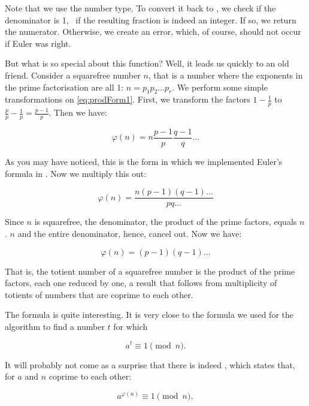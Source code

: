 \documentclass[tikz]{scrreprt}
\newcommand{\texfamily}{\fontfamily{cmtex}\selectfont}
\begin{document}
Note that we use the \text{\texfamily {\itshape Ratio}} number type.
To convert it back to \text{\texfamily {\itshape Natural}},
we check if the denominator is 1,
\ie\ if the resulting fraction is indeed
an integer. If so, we return the numerator.
Otherwise, we create an error, which, of course, 
should not occur if Euler was right.

But what is so special about this function?
Well, it leads us quickly to an old friend.
Consider a squarefree number $n$, that is a number
where the exponents in the prime factorisation
are all 1: $n = p_1p_2\dots p_r$.
We perform some simple transformations on 
\ref{eq:prodForm1}.
First, we transform the factors $1-\frac{1}{p}$
to $\frac{p}{p} - \frac{1}{p} = \frac{p-1}{p}$.
Then we have:

\begin{equation}
\varphi(n) = n\frac{p-1}{p}\frac{q-1}{q}\dots
\end{equation}

As you may have noticed,
this is the form in which we implemented Euler's formula in \text{\texfamily ptot}.
Now we multiply this out:

\begin{equation}
\varphi(n) = \frac{n(p-1)(q-1)\dots}{pq\dots}
\end{equation}

Since $n$ is squarefree, the denominator,
the product of the prime factors, equals $n$.
$n$ and the entire denominator, hence,
cancel out. Now we have:

\begin{equation}
\varphi(n) = (p-1)(q-1)\dots
\end{equation}

That is, the totient number of a squarefree number
is the product of the prime factors, each one
reduced by one, a result that follows
from multiplicity of totients of numbers that are coprime
to each other.

The formula is quite interesting.
It is very close to the formula we used for the
 algorithm to find a number $t$
for which

\[
a^t \equiv 1 \pmod{n}.
\]

It will probably not come as a surprise 
that there is indeed ,
which states that, for $a$ and $n$ coprime
to each other:

\begin{equation}
a^{\varphi(n)} \equiv 1 \pmod{n},
\end{equation}
\end{document}
